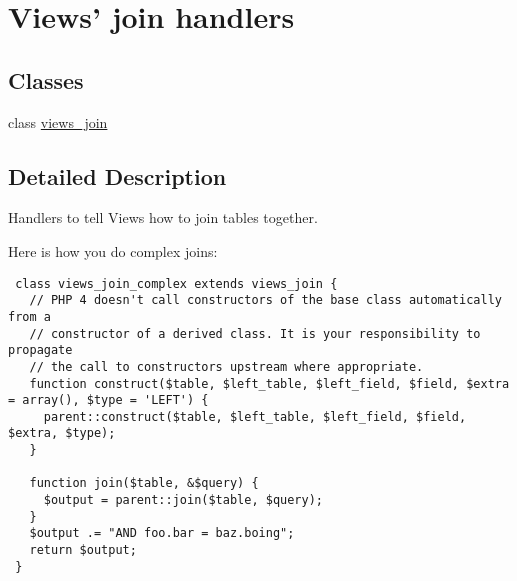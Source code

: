 \hypertarget{group__views__join__handlers}{
\section{Views' join handlers}
\label{group__views__join__handlers}
}
\subsection*{Classes}
\begin{CompactItemize}
\item 
class \hyperlink{classviews__join}{views\_\-join}
\end{CompactItemize}


\subsection{Detailed Description}
Handlers to tell Views how to join tables together.

Here is how you do complex joins:



\begin{Code}\begin{verbatim} class views_join_complex extends views_join {
   // PHP 4 doesn't call constructors of the base class automatically from a
   // constructor of a derived class. It is your responsibility to propagate
   // the call to constructors upstream where appropriate.
   function construct($table, $left_table, $left_field, $field, $extra = array(), $type = 'LEFT') {
     parent::construct($table, $left_table, $left_field, $field, $extra, $type);
   }

   function join($table, &$query) {
     $output = parent::join($table, $query);
   }
   $output .= "AND foo.bar = baz.boing";
   return $output;
 }
\end{verbatim}
\end{Code}

 